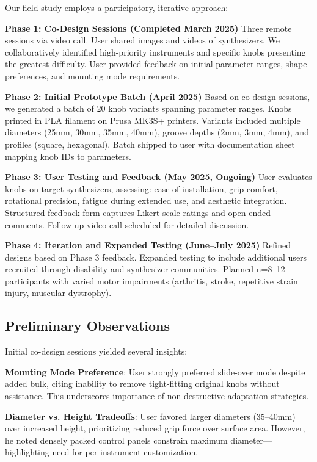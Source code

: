 \documentclass[sigconf]{nimeart}
\begin{document}
Our field study employs a participatory, iterative approach:

\textbf{Phase 1: Co-Design Sessions (Completed March 2025)}
Three remote sessions via video call. User shared images and videos of synthesizers. We collaboratively identified high-priority instruments and specific knobs presenting the greatest difficulty. User provided feedback on initial parameter ranges, shape preferences, and mounting mode requirements.

\textbf{Phase 2: Initial Prototype Batch (April 2025)}
Based on co-design sessions, we generated a batch of 20 knob variants spanning parameter ranges. Knobs printed in PLA filament on Prusa MK3S+ printers. Variants included multiple diameters (25mm, 30mm, 35mm, 40mm), groove depths (2mm, 3mm, 4mm), and profiles (square, hexagonal). Batch shipped to user with documentation sheet mapping knob IDs to parameters.

\textbf{Phase 3: User Testing and Feedback (May 2025, Ongoing)}
User evaluates knobs on target synthesizers, assessing: ease of installation, grip comfort, rotational precision, fatigue during extended use, and aesthetic integration. Structured feedback form captures Likert-scale ratings and open-ended comments. Follow-up video call scheduled for detailed discussion.


\textbf{Phase 4: Iteration and Expanded Testing (June--July 2025)}
Refined designs based on Phase 3 feedback. Expanded testing to include additional users recruited through disability and synthesizer communities. Planned n=8--12 participants with varied motor impairments (arthritis, stroke, repetitive strain injury, muscular dystrophy).

\subsection{Preliminary Observations}

Initial co-design sessions yielded several insights:

\textbf{Mounting Mode Preference}: User strongly preferred slide-over mode despite added bulk, citing inability to remove tight-fitting original knobs without assistance. This underscores importance of non-destructive adaptation strategies.

\textbf{Diameter vs. Height Tradeoffs}: User favored larger diameters (35--40mm) over increased height, prioritizing reduced grip force over surface area. However, he noted densely packed control panels constrain maximum diameter—highlighting need for per-instrument customization.
\end{document}
